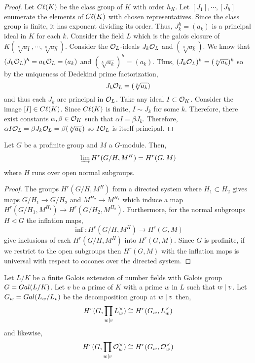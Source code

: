 \documentclass[12pt]{extarticle}
\begin{document}
\begin{proof}
Let $C\ell(K)$ be the class group of $K$ with order $h_K$. Let $[J_1], \cdots, [J_h]$ enumerate the elements of $C\ell(K)$ with chosen representatives. Since the class group is finite, it has exponent dividing its order. Thus, $J_k^h = (a_k)$ is a principal ideal in $K$ for each $k$. Consider the field $L$ which is the galois closure of $K(\sqrt[h]{a_1}, \cdots, \sqrt[h]{a_h})$. Consider the $\mathcal{O}_{L}$-ideals $J_k \mathcal{O}_{L}$ and $(\sqrt[h]{a_k})$. We know that $(J_k \mathcal{O}_{L})^h = a_k \mathcal{O}_{L} = (a_k)$ and $(\sqrt[h]{a_k})^h = (a_k)$. Thus, $(J_k \mathcal{O}_{L})^h = (\sqrt[h]{a_k})^h$ so by the uniqueness of Dedekind prime factorization,
\[ J_k \mathcal{O}_{L} = (\sqrt[h]{a_k}) \]
and thus each $J_k$ are principal in $\mathcal{O}_{L}$. Take any ideal $I \subset \mathcal{O}_{K}$. Consider the image $[I] \in C\ell(K)$. Since $C\ell(K)$ is finite, $I \sim J_k$ for some $k$. Therefore, there exist constants $\alpha, \beta \in \mathcal{O}_{K}$ such that $\alpha I = \beta J_k$. Therefore, $\alpha I \mathcal{O}_{L} = \beta J_k \mathcal{O}_{L} = \beta (\sqrt[h]{a_k})$ so $I \mathcal{O}_{L}$ is itself principal.
\end{proof}

\begin{lemma} \label{direct_lim}
Let $G$ be a profinite group and $M$ a $G$-module. Then,
\[ \varinjlim H^r(G / H, M^H) = H^r(G, M) \]
where $H$ runs over open normal subgroups. 
\end{lemma}

\begin{proof}
The groups $H^r(G / H, M^H)$ form a directed system where $H_1 \subset H_2$ gives maps $G / H_1 \to G / H_2$ and $M^{H_2} \to M^{H_1}$ which induce a map $H^r( G / H_1, M^{H_1}) \to H^r(G / H_2, M^{H_2})$. Furthermore, for the normal subgroups $H \triangleleft G$ the inflation maps,
\[ \inf : H^r(G / H, M^H) \to H^r(G, M) \] 
give inclusions of each $H^r(G / H, M^H)$ into $H^r(G, M)$. Since $G$ is profinite, if we restrict to the open subgroups then $H^r(G, M)$ with the inflation maps is universal with respect to cocones over the directed system. 

\end{proof}
\begin{lemma} \label{decomp_cohomology}
Let $L/K$ be a finite Galois extension of number fields with Galois group $G = Gal \small(L/K \small)$. Let $v$ be a prime of $K$ with a prime $w$ in $L$ such that $w \mid v$. Let $G_w = Gal \small(L_w / L_v \small)$ be the decomposition group at $w \mid v$ then,
\[ H^r(G, \prod_{w \mid v} L_w^\times) \cong H^r(G_w, L_{w}^\times) \] 
and likewise,
\[ H^r(G, \prod_{w \mid v} \mathcal{O}_{w}^\times) \cong H^r(G_w, \mathcal{O}_{w}^\times) \] 
\end{lemma} 
\end{document}
